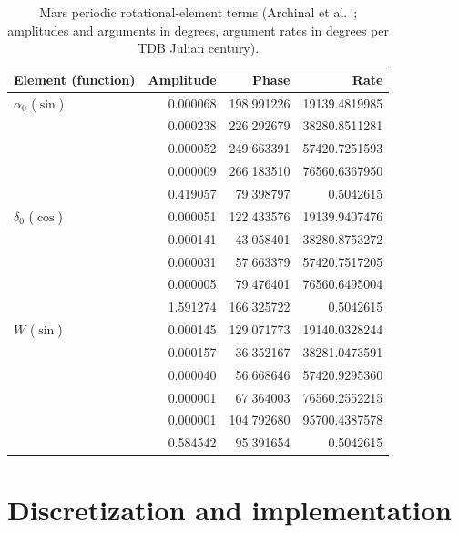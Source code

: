 \begin{table}[htbp]
  \centering
  \caption{Mars periodic rotational-element terms (Archinal et
    al.~\cite{archinal2018}; amplitudes and arguments in degrees, argument
    rates in degrees per TDB Julian century).}
  \label{tab:frames:mars}
  \begin{tabular}{lrrr}
    \toprule
    Element (function) & Amplitude & Phase & Rate \\
    \midrule
    $\alpha_0$ ($\sin$) & 0.000068 & 198.991226 & 19139.4819985 \\
                        & 0.000238 & 226.292679 & 38280.8511281 \\
                        & 0.000052 & 249.663391 & 57420.7251593 \\
                        & 0.000009 & 266.183510 & 76560.6367950 \\
                        & 0.419057 & 79.398797 & 0.5042615 \\
    \midrule
    $\delta_0$ ($\cos$) & 0.000051 & 122.433576 & 19139.9407476 \\
                        & 0.000141 & 43.058401 & 38280.8753272 \\
                        & 0.000031 & 57.663379 & 57420.7517205 \\
                        & 0.000005 & 79.476401 & 76560.6495004 \\
                        & 1.591274 & 166.325722 & 0.5042615 \\
    \midrule
    $W$ ($\sin$)        & 0.000145 & 129.071773 & 19140.0328244 \\
                        & 0.000157 & 36.352167 & 38281.0473591 \\
                        & 0.000040 & 56.668646 & 57420.9295360 \\
                        & 0.000001 & 67.364003 & 76560.2552215 \\
                        & 0.000001 & 104.792680 & 95700.4387578 \\
                        & 0.584542 & 95.391654 & 0.5042615 \\
    \bottomrule
  \end{tabular}
\end{table}

\section{Discretization and implementation}
\label{sec:frames:implementation}

